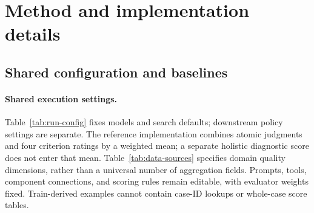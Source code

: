 \section{Method and implementation details}
\label{app:algorithm}

\subsection{Shared configuration and baselines}
\label{app:adaptation}
\paragraph{Shared execution settings.}
\label{app:runtime-config}
Table~\ref{tab:run-config} fixes models and search defaults; downstream policy settings are separate.
The reference implementation combines atomic judgments and four criterion ratings by a weighted mean; a separate holistic diagnostic score does not enter that mean.
Table~\ref{tab:data-sources} specifies domain quality dimensions, rather than a universal number of aggregation fields.
Prompts, tools, component connections, and scoring rules remain editable, with evaluator weights fixed.
Train-derived examples cannot contain case-ID lookups or whole-case score tables.

